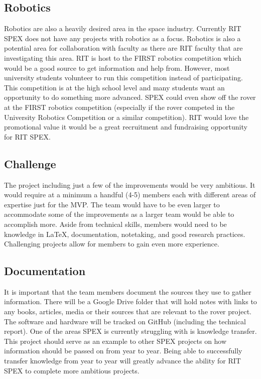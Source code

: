 \documentclass[conference]{IEEEtran} %
\begin{document}
\subsection{Robotics}
\label{subsec:robotics}
Robotics are also a heavily desired area in the space industry. Currently RIT SPEX does not have any projects with robotics as a focus. Robotics is also a potential area for collaboration with faculty as there are RIT faculty that are investigating this area. RIT is host to the FIRST robotics competition which would be a good source to get information and help from. However, most university students volunteer to run this competition instead of participating. This competition is at the high school level and many students want an opportunity to do something more advanced. SPEX could even show off the rover at the FIRST robotics competition (especially if the rover competed in the University Robotics Competition or a similar competition). RIT would love the promotional value it would be a great recruitment and fundraising opportunity for RIT SPEX.

\subsection{Challenge}
\label{subsec:challenge}
The project including just a few of the improvements would be very ambitious. It would require at a minimum a handful (4-5) members each with different areas of expertise just for the MVP. The team would have to be even larger to accommodate some of the improvements as a larger team would be able to accomplish more. Aside from technical skills, members would need to be knowledge in LaTeX, documentation, notetaking, and good research practices. Challenging projects allow for members to gain even more experience. 

\subsection{Documentation}
\label{subsec:docs}
It is important that the team members document the sources they use to gather information. There will be a Google Drive folder that will hold notes with links to any books, articles, media or their sources that are relevant to the rover project. The software and hardware will be tracked on GitHub (including the technical report). One of the areas SPEX is currently struggling with is knowledge transfer. This project should serve as an example to other SPEX projects on how information should be passed on from year to year. Being able to successfully transfer knowledge from year to year will greatly advance the ability for RIT SPEX to complete more ambitious projects.
\end{document}
